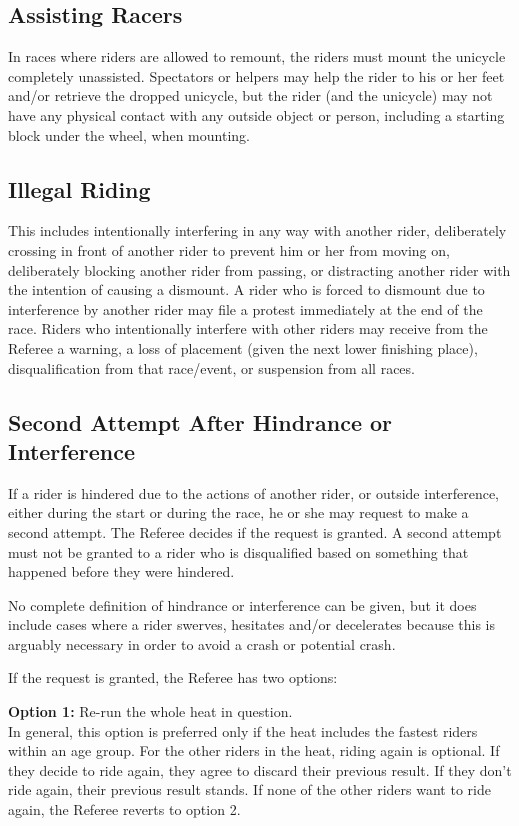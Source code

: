 \subsection{Assisting Racers}

In races where riders are allowed to remount, the riders must mount the unicycle completely unassisted.
Spectators or helpers may help the rider to his or her feet and/or retrieve the dropped unicycle, but the rider (and the unicycle) may not have any physical contact with any outside object or person, including a starting block under the wheel, when mounting.

\subsection{Illegal Riding}

This includes intentionally interfering in any way with another rider, deliberately crossing in front of another rider to prevent him or her from moving on, deliberately blocking another rider from passing, or distracting another rider with the intention of causing a dismount.
A rider who is forced to dismount due to interference by another rider may file a protest immediately at the end of the race.
Riders who intentionally interfere with other riders may receive from the Referee a warning, a loss of placement (given the next lower finishing place), disqualification from that race/event, or suspension from all races.

\subsection{Second Attempt After Hindrance or Interference}

If a rider is hindered due to the actions of another rider, or outside interference, either during the start or during the race, he or she may request to make a second attempt.
The Referee decides if the request is granted.
A second attempt must not be granted to a rider who is disqualified based on something that happened before they were hindered.

No complete definition of hindrance or interference can be given, but it does include cases where a rider swerves, hesitates and/or decelerates because this is arguably necessary in order to avoid a crash or potential crash.

If the request is granted, the Referee has two options:

\textbf{Option 1:}
Re-run the whole heat in question.\\
In general, this option is preferred only if the heat includes the fastest riders within an age group.
For the other riders in the heat, riding again is optional.
If they decide to ride again, they agree to discard their previous result.
If they don't ride again, their previous result stands.
If none of the other riders want to ride again, the Referee reverts to option 2.

